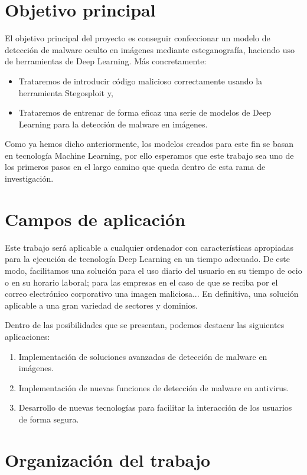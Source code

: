 \section{Objetivo principal}

El objetivo principal del proyecto es conseguir confeccionar un modelo de detección de malware oculto en imágenes mediante esteganografía, haciendo uso de herramientas de Deep Learning. Más concretamente:

\begin{itemize}
\item Trataremos de introducir código malicioso correctamente usando la herramienta Stegosploit y,
\item Trataremos de entrenar de forma eficaz una serie de modelos de Deep Learning para la detección de malware en imágenes.
\end{itemize}

Como ya hemos dicho anteriormente, los modelos creados para este fin se basan en tecnología Machine Learning, por ello esperamos que este trabajo sea uno de los primeros pasos en el largo camino que queda dentro de esta rama de investigación.

\section{Campos de aplicación}

Este trabajo será aplicable a cualquier ordenador con características apropiadas para la ejecución de tecnología Deep Learning en un tiempo adecuado. De este modo, facilitamos una solución para el uso diario del usuario en su tiempo de ocio o en su horario laboral; para las empresas en el caso de que se reciba por el correo electrónico corporativo una imagen maliciosa... En definitiva, una solución aplicable a una gran variedad de sectores y dominios. 

Dentro de las posibilidades que se presentan, podemos destacar las siguientes aplicaciones:
\begin{enumerate}
\item Implementación de soluciones avanzadas de detección de malware en imágenes.
\item Implementación de nuevas funciones de detección de malware en antivirus.
\item Desarrollo de nuevas tecnologías para facilitar la interacción de los usuarios de forma segura.
\end{enumerate}

\section{Organización del trabajo}

